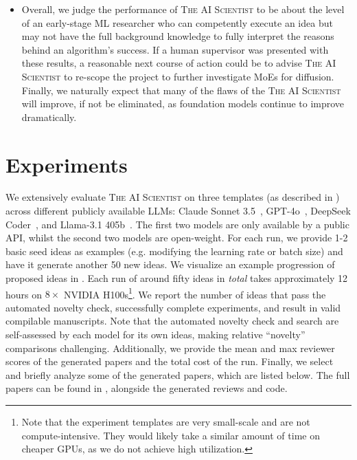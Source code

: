 \documentclass[11pt, a4paper]{include/gdm_format}
\newcommand{\ouralgo}{\textsc{The AI Scientist}\xspace}
\begin{document}
\begin{itemize}
At the current capabilities of \ouralgo, this can be resolved by human feedback.
However, future generations of foundation models may propose ideas that are challenging for humans to reason about and evaluate.
This links to the field of ``superalignment''~\citep{burns2023weaktostronggeneralizationelicitingstrong} or supervising AI systems that may be smarter than us, which is an active area of research.
\item Overall, we judge the performance of \ouralgo to be about the level of an early-stage ML researcher who can competently execute an idea but may not have the full background knowledge to fully interpret the reasons behind an algorithm's success. If a human supervisor was presented with these results, a reasonable next course of action could be to advise \ouralgo to re-scope the project to further investigate MoEs for diffusion.
Finally, we naturally expect that many of the flaws of the \ouralgo will improve, if not be eliminated, as foundation models continue to improve dramatically.
\end{itemize}

\section{Experiments}
\label{sec:experiments}
We extensively evaluate \ouralgo on three templates (as described in ) across different publicly available LLMs: Claude Sonnet 3.5~\citep{claude3}, GPT-4o~\citep{gpt4}, DeepSeek Coder~\citep{zhu2024deepseek}, and Llama-3.1 405b~\citep{llama3}.
The first two models are only available by a public API, whilst the second two models are open-weight.
For each run, we provide 1-2 basic seed ideas as examples (e.g. modifying the learning rate or batch size) and have it generate another 50 new ideas.
We visualize an example progression of proposed ideas in .
Each run of around fifty ideas in \textit{total} takes approximately 12 hours on $8\times$ NVIDIA H100s\footnote{Note that the experiment templates are very small-scale and are not compute-intensive. They would likely take a similar amount of time on cheaper GPUs, as we do not achieve high utilization.}. 
We report the number of ideas that pass the automated novelty check, successfully complete experiments, and result in valid compilable manuscripts. Note that the automated novelty check and search are self-assessed by each model for its own ideas, making relative ``novelty'' comparisons challenging.
Additionally, we provide the mean and max reviewer scores of the generated papers and the total cost of the run.
Finally, we select and briefly analyze some of the generated papers, which are listed below.
The full papers can be found in , alongside the generated reviews and code.
\end{document}
